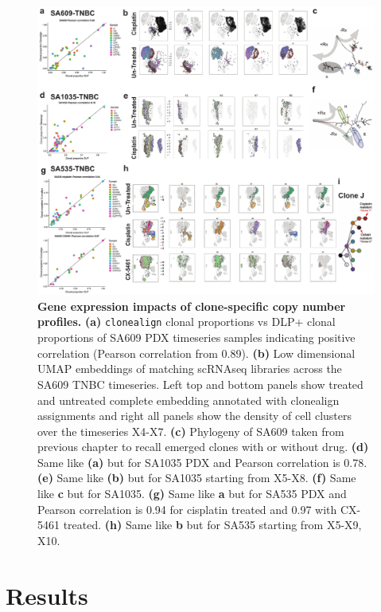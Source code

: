 \begin{figure}
\centering
\includegraphics[width=\textwidth]{Figures/fig2_clonealignembeddings.pdf}
	
\caption[Gene expression impacts of clone-specific copy number profiles]
	{\small
	\textbf{Gene expression impacts of clone-specific copy number profiles.}
	   \textbf{(a)} \texttt{clonealign} clonal proportions vs DLP+ clonal proportions of SA609 PDX timeseries samples indicating positive correlation (Pearson correlation from 0.89).
	    \textbf{(b)} Low dimensional \ac{UMAP} embeddings of matching scRNAseq libraries across the SA609 TNBC timeseries. Left top and bottom panels show treated and untreated complete embedding annotated with clonealign assignments and right all panels show the density of cell clusters over the timeseries X4-X7.
	     \textbf{(c)} Phylogeny of SA609 taken from previous chapter to recall emerged clones with or without drug. 
	     \textbf{(d)} Same like \textbf{(a)} but for SA1035 PDX and Pearson correlation is 0.78. \textbf{(e)} Same like \textbf{(b)} but for SA1035 starting from X5-X8. \textbf{(f)} Same like \textbf{c} but for SA1035. \textbf{(g)} Same like \textbf{a} but for SA535 PDX and Pearson correlation is 0.94 for cisplatin treated and 0.97 with CX-5461 treated. \textbf{(h)} Same like \textbf{b} but for SA535 starting from X5-X9, X10.
	}
	\label{fig:fig2_clonealignembeddings.pdf}
\end{figure}


\section{Results}

